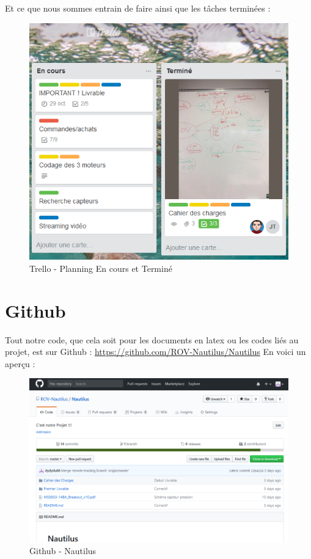 \documentclass[a4paper,11pt]{report}
\begin{document}
						\newpage Et ce que nous sommes entrain de faire ainsi que les tâches terminées :
						\begin{figure}[!h]
							\begin{center}
								\includegraphics[scale=0.5]{Illustrations/Planning2.png}
								\caption{Trello - Planning En cours et Terminé}
							\end{center}
						\end{figure}
						
        \section{Github}
				Tout notre code, que cela soit pour les documents en latex ou les codes liés au projet, est sur Github :
				\url{https://github.com/ROV-Nautilus/Nautilus}
				\newline En voici un aperçu :
					\begin{figure}[!h]
							\begin{center}
								\includegraphics[scale=0.4]{Illustrations/Github.png}
								\caption{Github - Nautilus}
							\end{center}
						\end{figure}
				
\end{document}

